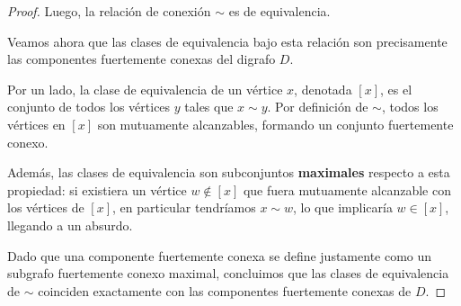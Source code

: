 \begin{proof}
	Luego, la relación de conexión \( \sim \) es de equivalencia.

	Veamos ahora que las clases de equivalencia bajo esta relación son precisamente las componentes fuertemente conexas del digrafo \( D \).

	Por un lado, la clase de equivalencia de un vértice \( x \), denotada \( [x] \), es el conjunto de todos los vértices \( y \) tales que \( x \sim y \). Por definición de \( \sim \), todos los vértices en \( [x] \) son mutuamente alcanzables, formando un conjunto fuertemente conexo.

	Además, las clases de equivalencia son subconjuntos \textbf{maximales} respecto a esta propiedad: si existiera un vértice \( w \notin [x] \) que fuera mutuamente alcanzable con los vértices de \( [x] \), en particular tendríamos \( x \sim w \), lo que implicaría \( w \in [x] \), llegando a un absurdo.

	Dado que una componente fuertemente conexa se define justamente como un subgrafo fuertemente conexo maximal, concluimos que las clases de equivalencia de \( \sim \) coinciden exactamente con las componentes fuertemente conexas de \( D \).
\end{proof}

\vspace{0.5cm}

